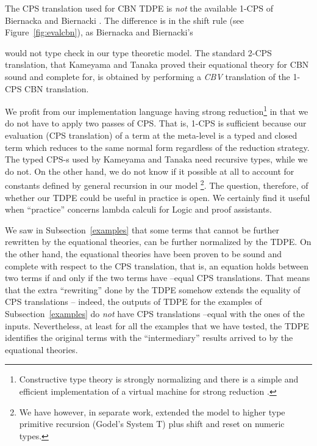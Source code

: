\documentclass{eptcs}
\theoremstyle{definition}
\theoremstyle{plain}
\theoremstyle{remark}
\begin{document}
The CPS translation used for CBN TDPE is \emph{not} the available 1-CPS of Biernacka and Biernacki \cite{BiernackaB2009}. The difference is in the shift rule (see Figure~\ref{fig:evalcbn}), as Biernacka and Biernacki's

would not type check in our type theoretic model. The standard 2-CPS translation, that Kameyama and Tanaka \cite{KameyamaTanaka2010} proved their equational theory for CBN sound and complete for, is obtained by performing a \emph{CBV} translation of the 1-CPS CBN translation.

We profit from our implementation language having strong reduction\footnote{Constructive type theory is strongly normalizing and there is a simple and efficient implementation of a virtual machine for strong reduction \cite{GregoireL2002}.} in that we do not have to apply two passes of CPS. That is, 1-CPS is sufficient because our evaluation (CPS translation) of a term at the meta-level is a typed and closed term which reduces to the same normal form regardless of the reduction strategy. The typed CPS-s used by Kameyama and Tanaka need recursive types, while we do not. On the other hand, we do not know if it possible at all to account for constants defined by general recursion in our model \footnote{We have however, in separate work, extended the model to higher type primitive recursion (Godel's System T) plus shift and reset on numeric types.}. The question, therefore, of whether our TDPE could be useful in practice is open. We certainly find it useful when ``practice'' concerns lambda calculi for Logic and proof assistants.

We saw in Subsection~\ref{examples} that some terms that cannot be further rewritten by the equational theories, can be further normalized by the TDPE. On the other hand, the equational theories have been proven to be sound and complete with respect to the CPS translation, that is, an equation holds between two terms if and only if the two terms have --equal CPS translations. That means that the extra ``rewriting'' done by the TDPE somehow extends the equality of CPS translations -- indeed, the outputs of TDPE for the examples of Subsection~\ref{examples} do \emph{not} have CPS translations --equal with the ones of the inputs. Nevertheless, at least for all the examples that we have tested, the TDPE identifies the original terms with the ``intermediary'' results arrived to by the equational theories.
\end{document}
